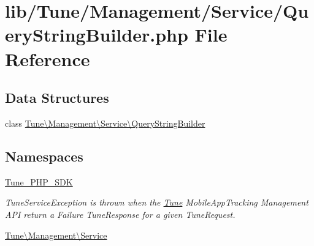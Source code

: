 \hypertarget{QueryStringBuilder_8php}{\section{lib/\-Tune/\-Management/\-Service/\-Query\-String\-Builder.php File Reference}
\label{QueryStringBuilder_8php}
}
\subsection*{Data Structures}
\begin{DoxyCompactItemize}
\item 
class \hyperlink{classTune_1_1Management_1_1Service_1_1QueryStringBuilder}{Tune\textbackslash{}\-Management\textbackslash{}\-Service\textbackslash{}\-Query\-String\-Builder}
\end{DoxyCompactItemize}
\subsection*{Namespaces}
\begin{DoxyCompactItemize}
\item 
\hyperlink{namespaceTune__PHP__SDK}{Tune\-\_\-\-P\-H\-P\-\_\-\-S\-D\-K}
\begin{DoxyCompactList}\small\item\em Tune\-Service\-Exception is thrown when the \hyperlink{namespaceTune}{Tune} Mobile\-App\-Tracking Management A\-P\-I return a Failure Tune\-Response for a given Tune\-Request. \end{DoxyCompactList}\item 
\hyperlink{namespaceTune_1_1Management_1_1Service}{Tune\textbackslash{}\-Management\textbackslash{}\-Service}
\end{DoxyCompactItemize}

